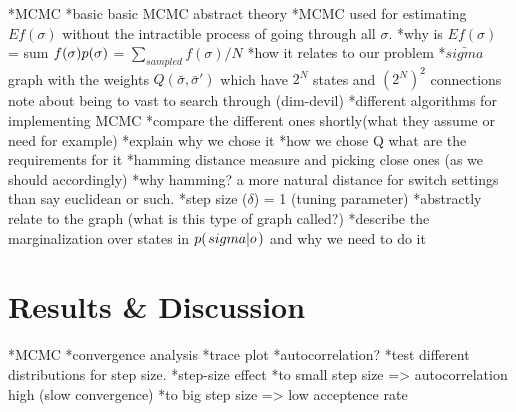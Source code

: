 \documentclass[a4paper,11pt]{kth-mag}
\begin{document}
                
                


            
            
            
        *MCMC
            *basic basic MCMC abstract theory
            *MCMC used for estimating $E{f(\sigma)}$ without the intractible process of going through all
            $\sigma$.
            *why is $E{f(\sigma)}$ = 
            sum $f(\sigma)p{(\sigma)}$ = $\sum_{sampled} f(\sigma)/N$
            *how it relates to our problem
                *$\bar{sigma}$ graph with the weights $Q(\bar{\sigma},\bar{\sigma}')$
                which have $2^N$ states and $(2^N)^2$ connections
                note about being to vast to search through (dim-devil)
            *different algorithms for implementing MCMC
            *compare the different ones shortly(what they assume or
            need for example)
            *explain why we chose it
            *how we chose Q what are the requirements for it
                *hamming distance measure and picking close ones (as we should
                accordingly)
                *why hamming? a more natural distance for switch settings than
                say euclidean or such.
                *step size ($\delta$) = 1 (tuning parameter)
            *abstractly relate to the graph (what is this type of graph
            called?)
        *describe the marginalization over states in $p{(\left. sigma \middle\vert o \right.)}$ and why we need
        to do it


    \chapter{Results \& Discussion}
        *MCMC
            *convergence analysis
                *trace plot
                *autocorrelation?
                *test different distributions for step size.
                    *step-size effect
                        *to small step size => autocorrelation high (slow convergence)
                        *to big step size => low acceptence rate
\end{document}
